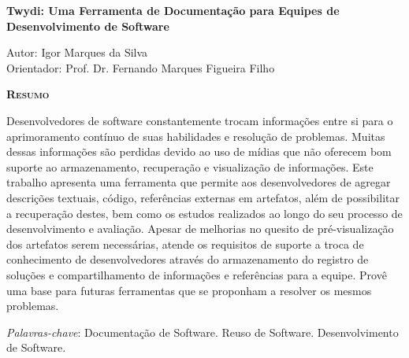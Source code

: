 \begin{center}
	{\Large{\textbf{Twydi: Uma Ferramenta de Documentação para Equipes de Desenvolvimento de Software}}}
\end{center}

\vspace{1cm}

\begin{flushright}
	Autor: Igor Marques da Silva\\
	Orientador: Prof. Dr. Fernando Marques Figueira Filho
\end{flushright}

\vspace{1cm}

\begin{center}
	\Large{\textsc{\textbf{Resumo}}}
\end{center}

\noindent Desenvolvedores de software constantemente trocam informações entre si para o aprimoramento contínuo de suas habilidades e resolução de problemas. Muitas dessas informações são perdidas devido ao uso de mídias que não oferecem bom suporte ao armazenamento, recuperação e visualização de informações.
Este trabalho apresenta uma ferramenta que permite aos desenvolvedores de agregar descrições textuais, código, referências externas em artefatos, além de possibilitar a recuperação destes, bem como os estudos realizados ao longo do seu processo de desenvolvimento e avaliação. Apesar de melhorias no quesito de pré-visualização dos artefatos serem necessárias, atende os requisitos de suporte a troca de conhecimento de desenvolvedores através do armazenamento do registro de soluções e compartilhamento de informações e  referências para a equipe. Provê uma base para futuras ferramentas que se proponham a resolver os mesmos problemas.

\noindent\textit{Palavras-chave}: Documentação de Software. Reuso de Software. Desenvolvimento de Software.
